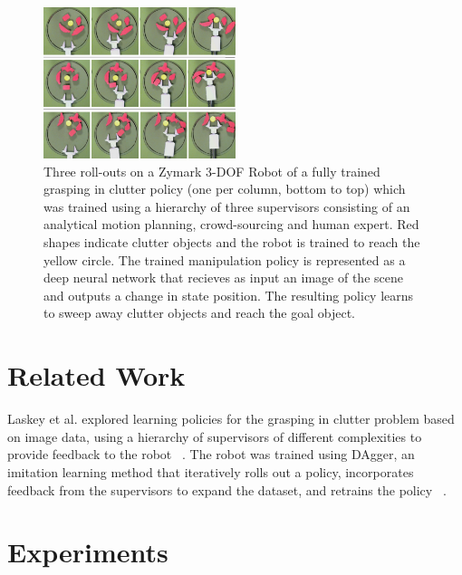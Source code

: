 \documentclass[10pt, conference]{ieeeconf}      %
\begin{document}
\begin{figure}
\includegraphics[width=0.5\textwidth]{f_figs/teaser.png}
\caption{
Three roll-outs on a Zymark 3-DOF Robot of a fully trained grasping in clutter policy (one per column, bottom to top) which was trained using a
hierarchy of three supervisors consisting of an analytical motion planning, crowd-sourcing and human expert. 
Red shapes indicate clutter objects and the robot is trained to reach the yellow circle. The trained manipulation policy is represented as a deep neural network that recieves as input an image of the scene and outputs a change in state position. The resulting policy learns to sweep away clutter objects and reach the goal object.  }
\vspace*{-20pt}
\label{fig:teaser}
\end{figure}

\section{Related Work}
Laskey et al. explored learning policies for the grasping in clutter problem based on image data, using a hierarchy of supervisors of different complexities to provide feedback to the robot ~\cite{hierarchical_supervisors}. The robot was trained using DAgger, an imitation learning method that iteratively rolls out a policy, incorporates feedback from the supervisors to expand the dataset, and retrains the policy ~\cite{ross2010reduction}. 

\section{Experiments} \label{sec:Exp}
\end{document}
